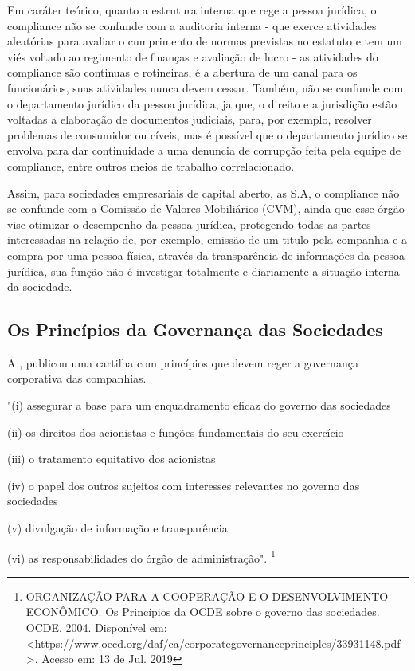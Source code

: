 Em caráter teórico, quanto a estrutura interna que rege a pessoa jurídica, o compliance não se confunde com a auditoria interna - que exerce atividades aleatórias para avaliar o cumprimento de normas previstas no estatuto e tem um viés voltado ao regimento de finanças e avaliação de lucro - as atividades do compliance são continuas e rotineiras, é a abertura de um canal para os funcionários, suas atividades nunca devem cessar. Também, não se confunde com o departamento jurídico da pessoa jurídica, ja que, o direito e a jurisdição estão voltadas a elaboração de documentos judiciais, para, por exemplo, resolver problemas de consumidor ou cíveis, mas é possível que o departamento jurídico se envolva para dar continuidade a uma denuncia de corrupção feita pela equipe de compliance, entre outros meios de trabalho correlacionado. 

Assim, para sociedades empresariais de capital aberto, as S.A, o compliance não se confunde com a Comissão de Valores Mobiliários (CVM), ainda que esse órgão vise otimizar o desempenho da pessoa jurídica, protegendo todas as partes interessadas na relação de, por exemplo, emissão de um titulo pela companhia e a compra por uma pessoa física, através da transparência de informações da pessoa jurídica, sua função não é investigar totalmente e diariamente a situação interna da sociedade. 

\subsection{Os Princípios da Governança das Sociedades}

A \cite{ocdeprincipios}, publicou uma cartilha com princípios que devem reger a governança corporativa das companhias. 

"(i) assegurar a base para um enquadramento eficaz do governo das sociedades 

(ii) os direitos dos acionistas e funções fundamentais do seu exercício

(iii) o tratamento equitativo dos acionistas

(iv) o papel dos outros sujeitos com interesses relevantes no governo
das sociedades

(v) divulgação de informação e transparência

(vi) as responsabilidades do órgão de administração". \footnote{ORGANIZAÇÃO PARA A COOPERAÇÃO E O DESENVOLVIMENTO ECONÔMICO. Os Princípios da OCDE sobre o governo das sociedades. OCDE, 2004. Disponível em: <https://www.oecd.org/daf/ca/corporategovernanceprinciples/33931148.pdf>. Acesso em: 13 de Jul. 2019}


